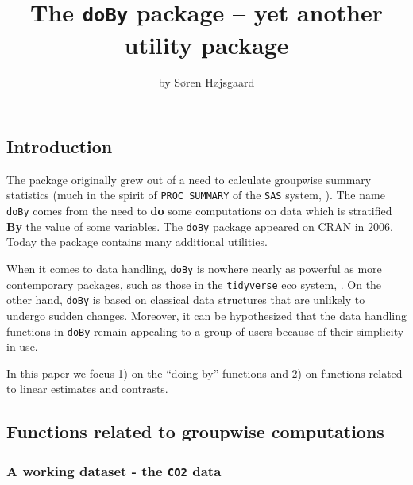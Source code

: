 \title{The \texttt{doBy} package -- yet another utility package}
\author{by Søren Højsgaard}

\maketitle


\hypertarget{introduction}{%
\subsection{Introduction}\label{introduction}}

The package originally grew out of a need to calculate groupwise summary
statistics (much in the spirit of \texttt{PROC\ SUMMARY} of the
\texttt{SAS} system, \citep{procsummary}). The name \texttt{doBy} comes
from the need to \textbf{do} some computations on data which is
stratified \textbf{By} the value of some variables. The \texttt{doBy}
package \citep{doby} appeared on CRAN in 2006. Today the package
contains many additional utilities.

When it comes to data handling, \texttt{doBy} is nowhere nearly as
powerful as more contemporary packages, such as those in the
\texttt{tidyverse} eco system, \citep{tidyverse}. On the other hand,
\texttt{doBy} is based on classical data structures that are unlikely to
undergo sudden changes. Moreover, it can be hypothesized that the data
handling functions in \texttt{doBy} remain appealing to a group of users
because of their simplicity in use.

In this paper we focus 1) on the ``doing by'' functions and 2) on
functions related to linear estimates and contrasts.

\hypertarget{functions-related-to-groupwise-computations}{%
\subsection{Functions related to groupwise
computations}\label{functions-related-to-groupwise-computations}}

\hypertarget{a-working-dataset---the-co2-data}{%
\subsubsection{\texorpdfstring{A working dataset - the \texttt{CO2}
data}{A working dataset - the CO2 data}}\label{a-working-dataset---the-co2-data}}

